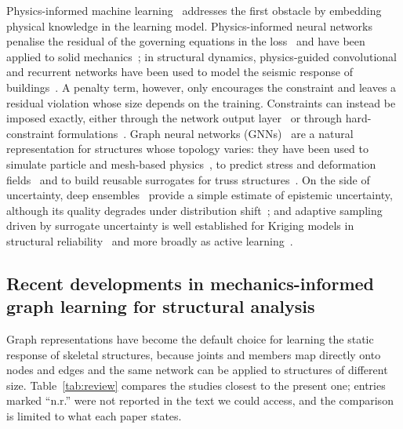 Physics-informed machine learning~\cite{karniadakis2021piml} addresses the first obstacle by embedding physical knowledge in the learning model. Physics-informed neural networks penalise the residual of the governing equations in the loss~\cite{raissi2019pinn} and have been applied to solid mechanics~\cite{haghighat2021solid}; in structural dynamics, physics-guided convolutional and recurrent networks have been used to model the seismic response of buildings~\cite{zhang2020phycnn,zhang2020phylstm}. A penalty term, however, only encourages the constraint and leaves a residual violation whose size depends on the training. Constraints can instead be imposed exactly, either through the network output layer~\cite{beucler2021constraints} or through hard-constraint formulations~\cite{lu2021hard}. Graph neural networks (GNNs)~\cite{battaglia2018relational,gilmer2017mpnn} are a natural representation for structures whose topology varies: they have been used to simulate particle and mesh-based physics~\cite{sanchez2020learning,pfaff2021meshgraphnets}, to predict stress and deformation fields~\cite{maurizi2022gnn} and to build reusable surrogates for truss structures~\cite{whalen2022truss}. On the side of uncertainty, deep ensembles~\cite{lakshminarayanan2017ensembles} provide a simple estimate of epistemic uncertainty, although its quality degrades under distribution shift~\cite{ovadia2019shift}; and adaptive sampling driven by surrogate uncertainty is well established for Kriging models in structural reliability~\cite{bichon2008egra,echard2011akmcs} and more broadly as active learning~\cite{settles2009active}.

\subsection{Recent developments in mechanics-informed graph learning for structural analysis}\label{sec:review}

Graph representations have become the default choice for learning the static response of skeletal structures, because joints and members map directly onto nodes and edges and the same network can be applied to structures of different size. Table~\ref{tab:review} compares the studies closest to the present one; entries marked ``n.r.'' were not reported in the text we could access, and the comparison is limited to what each paper states.

